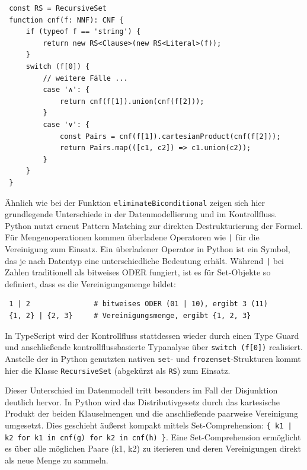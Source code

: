 \begin{verbatim}
 const RS = RecursiveSet
 function cnf(f: NNF): CNF {
     if (typeof f == 'string') { 
         return new RS<Clause>(new RS<Literal>(f));
     }
     switch (f[0]) {
         // weitere Fälle ...         
         case '∧': {
             return cnf(f[1]).union(cnf(f[2]));
         }
         case '∨': {
             const Pairs = cnf(f[1]).cartesianProduct(cnf(f[2]));
             return Pairs.map(([c1, c2]) => c1.union(c2));
         }
     }
 }
\end{verbatim}

Ähnlich wie bei der Funktion \texttt{eliminateBiconditional} zeigen sich hier grundlegende Unterschiede in der Datenmodellierung und im Kontrollfluss. Python nutzt erneut Pattern Matching zur direkten Destrukturierung der Formel. Für Mengenoperationen kommen überladene Operatoren wie \texttt{|} für die Vereinigung zum Einsatz. Ein überladener Operator in Python ist ein Symbol, das je nach Datentyp eine unterschiedliche Bedeutung erhält. Während \texttt{|} bei Zahlen traditionell als bitweises ODER fungiert, ist es für Set-Objekte so definiert, dass es die Vereinigungsmenge bildet:


\begin{verbatim}
 1 | 2               # bitweises ODER (01 | 10), ergibt 3 (11)
 {1, 2} | {2, 3}     # Vereinigungsmenge, ergibt {1, 2, 3}
\end{verbatim}

In TypeScript wird der Kontrollfluss stattdessen wieder durch einen Type Guard und anschließende kontrollflussbasierte Typanalyse über \texttt{switch (f[0])} realisiert. Anstelle der in Python genutzten nativen \texttt{set}- und \texttt{frozenset}-Strukturen kommt hier die Klasse \texttt{RecursiveSet} (abgekürzt als \texttt{RS}) zum Einsatz.

Dieser Unterschied im Datenmodell tritt besonders im Fall der Disjunktion deutlich hervor. In Python wird das Distributivgesetz durch das kartesische Produkt der beiden Klauselmengen und die anschließende paarweise Vereinigung umgesetzt. Dies geschieht äußerst kompakt mittels Set-Comprehension: \texttt{\{ k1 | k2 for k1 in cnf(g) for k2 in cnf(h) \}}. Eine Set-Comprehension ermöglicht es über alle möglichen Paare (k1, k2) zu iterieren und deren Vereinigungen direkt als neue Menge zu sammeln.

